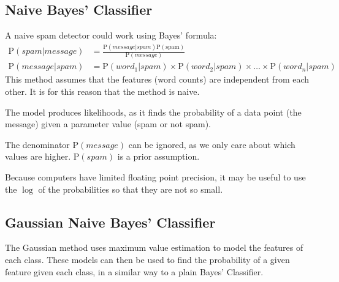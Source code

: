 \subsection{Naive Bayes' Classifier}
A naive spam detector could work using Bayes' formula:
\begin{align*}
    \mathrm{P}(spam|message) & = \frac{\mathrm{P}(message|spam)\mathrm{P(spam)}}{\mathrm{P}(message)}                                     \\
    \mathrm{P}(message|spam) & = \mathrm{P}(word_1 | spam) \times \mathrm{P}(word_2 | spam) \times \dots \times \mathrm{P}(word_n | spam)
\end{align*}
This method assumes that the features (word counts) are independent from each other. It is for this reason that the method is naive.

The model produces likelihoods, as it finds the probability of a data point (the message) given a parameter value (spam or not spam).

The denominator \(\mathrm{P}(message)\) can be ignored, as we only care about which values are higher. \(\mathrm{P}(spam)\) is a prior assumption.

Because computers have limited floating point precision, it may be useful to use the \(\log\) of the probabilities so that they are not so small.

\subsection{Gaussian Naive Bayes' Classifier}
The Gaussian method uses maximum value estimation to model the features of each class. These models can then be used to find the probability of a given feature given each class, in a similar way to a plain Bayes' Classifier.
